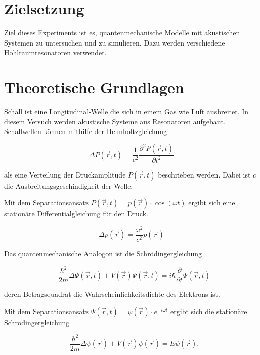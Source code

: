 \section{Zielsetzung}
Ziel dieses Experiments ist es, quantenmechanische Modelle mit akustischen Systemen zu untersuchen und zu simulieren.
Dazu werden verschiedene Hohlraumresonatoren verwendet.


\section{Theoretische Grundlagen}

\noindent
Schall ist eine Longitudinal-Welle die sich in einem Gas wie Luft ausbreitet.
In diesem Versuch werden akustische Systeme aus Resonatoren aufgebaut.
Schallwellen können mithilfe der Helmholtzgleichung 

\begin{equation*}
    \Delta P(\vec{r},t) = \frac{1}{c^2} \frac{\partial^2 P(\vec{r},t)}{\partial t^2}
\end{equation*}

\noindent
als eine Verteilung der Druckamplitude $P(\vec{r},t)$ beschrieben werden.
Dabei ist $c$ die Ausbreitungsgeschindigkeit der Welle.

\noindent
Mit dem Separationsansatz $P(\vec{r},t) = p(\vec{r}) \cdot \cos(\omega t)$ ergibt sich eine stationäre Differentialgleichung für den Druck.

\begin{equation}
    \Delta p(\vec{r}) = \frac{\omega^2}{c^2} p(\vec{r})
    \label{eqn:helmholtz}
\end{equation}

\noindent
Das quantenmechanische Analogon ist die Schrödingergleichung

\begin{equation*}
    -\frac{\hbar^2}{2m} \Delta \Psi(\vec{r},t) + V(\vec{r}) \Psi(\vec{r},t) = i\hbar \frac{\partial}{\partial t} \Psi(\vec{r},t)
\end{equation*}

\noindent
deren Betragsquadrat die Wahrscheinlichkeitsdichte des Elektrons ist.

\noindent
Mit dem Separationsansatz $\Psi(\vec{r},t) = \psi(\vec{r}) \cdot e^{-i \omega t}$ ergibt sich die stationäre Schrödingergleichung

\begin{equation}
    -\frac{\hbar^2}{2m} \Delta \psi(\vec{r}) + V(\vec{r}) \psi(\vec{r}) = E \psi(\vec{r}).
    \label{eqn:schroedinger}
\end{equation}

